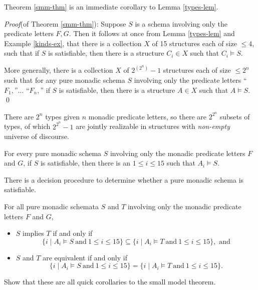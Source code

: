 Theorem \ref{smm-thm} is an immediate corollary to Lemma \ref{types-lem}.

\emph{Proof}(of Theorem \ref{smm-thm}): Suppose $S$ is a schema involving only the predicate letters $F, G$. Then it follows at once from Lemma \ref{types-lem} and Example \ref{kinds-ex}, that there is a collection $X$ of 15 structures each of size $\leq 4$,
such that if $S$ is satisfiable, then there is a structure $C_i \in X$ such that $C_i \models S.$ 
\iffalse
\begin{aside}
    Why? Because there are only $15$ canonical models. There are $2^4$ subsets of types (since we have $2^2 = 4$ types), but only 15 of those are realizable (since for any nonempty model, at least one type must be realized). For $i \in [15]$, we let each $C_i$ realize different types; since there are only 15 possible realized types, it follows that every structure has some $C_i$ as its homomorphic image. These $C_i$ are our canonical models. 
\end{aside}
\fi
More generally, there is a collection $X$ of $2^{(2^n)}-1$ structures each of size $\leq 2^n$
such that for any pure monadic schema $S$ involving only the predicate letters
``$F_1,$''$\ldots$ ``$F_n,$'' if $S$ is satisfiable, then there is a structure $A \in X$
such that $A \models S.$ \qed

\begin{aside}
    There are $2^n$ types given $n$ monadic predicate letters, so there are $2^{2^n}$ subsets of types, of which $2^{2^n} - 1$ are jointly realizable in structures with \emph{non-empty} universe of discourse.  
\end{aside}

\begin{corollary}
For every pure monadic schema $S$ involving only the monadic predicate letters $F$ and $G$, if $S$ is satisfiable, then there is an $1\leq i\leq 15$ such that $A_i\models S$. 
\end{corollary}

\begin{corollary}
There is a decision procedure to determine whether a pure
monadic schema is satisfiable.
\end{corollary}


\begin{corollary}\label{monad-cor}
For all pure monadic schemata $S$ and $T$ involving only the monadic predicate letters $F$ and $G$,
\begin{itemize}
\item[]\label{imp-item}
$S$ implies  $T$  if and only if 
\[\{i\mid A_i\models S\ \mbox{and}\ 1\leq i\leq 15\}\subseteq\{i\mid A_i\models T\ \mbox{and}\ 1\leq i\leq 15\},\mbox{ and}\]
\item[]\label{equiv-item}
$S$ and $T$ are equivalent if and only if 
\[\{i\mid A_i\models S\ \mbox{and}\ 1\leq i\leq 15\}=\{i\mid A_i\models T\ \mbox{and}\ 1\leq i\leq 15\}.\]
\end{itemize}

\begin{aside}
    Show that these are all quick corollaries to the small model theorem. 
\end{aside}
\end{corollary}

